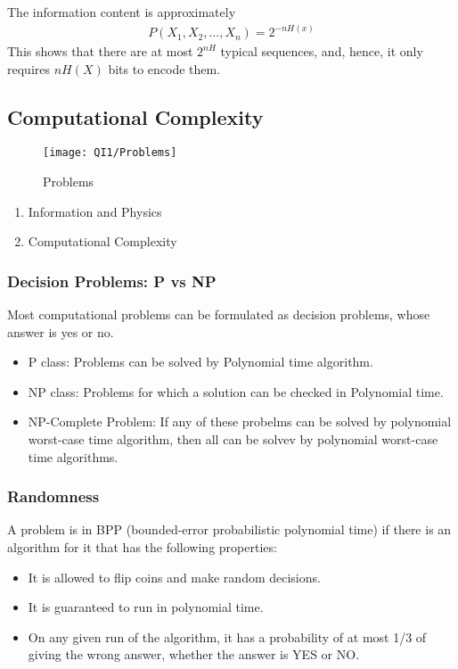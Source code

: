 The information content is approximately
\begin{align*}
    P(X_1, X_2, \dots , X_n)=2^{-nH(x)}
\end{align*}
This shows that there are at most $2^{nH}$ typical sequences,
and, hence, it only requires $nH(X )$ bits to encode them.

\subsection{Computational Complexity}
\begin{figure}[H]
    \centering
    \texttt{[image: QI1/Problems]}
    \caption{Problems}
\end{figure}

\begin{enumerate}
    \item Information and Physics
    \item Computational Complexity
\end{enumerate}

\subsubsection{Decision Problems: P vs NP}
Most computational problems can be formulated as decision problems, whose answer is yes or no. 

\begin{itemize}
    \item P class: Problems can be solved by Polynomial time algorithm. 
    \item NP class: Problems for which a solution can be checked in Polynomial time. 
    \item NP-Complete Problem: If any of these probelms can be solved by polynomial worst-case time algorithm, then all can be solvev by polynomial worst-case time algorithms.
\end{itemize}


\subsubsection{Randomness}
A problem is in BPP (bounded-error probabilistic polynomial time) if there is an algorithm for it that has the following properties: 
\begin{itemize}
    \item It is allowed to flip coins and make random decisions.
    \item It is guaranteed to run in polynomial time.
    \item On any given run of the algorithm, it has a probability of at most 1/3 of giving the wrong answer, whether the answer is YES or NO. 
\end{itemize}

